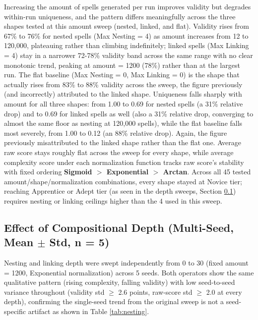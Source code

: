 \documentclass[]{article}
\begin{document}
        Increasing the amount of spells generated per run improves validity but degrades within-run uniqueness, and the pattern differs meaningfully across the three shapes tested at this amount sweep (nested, linked, and flat). Validity rises from 67\% to 76\% for nested spells (Max Nesting = 4) as amount increases from 12 to 120,000, plateauing rather than climbing indefinitely; linked spells (Max Linking = 4) stay in a narrower 72-78\% validity band across the same range with no clear monotonic trend, peaking at amount = 1200 (78\%) rather than at the largest run. The flat baseline (Max Nesting = 0, Max Linking = 0) is the shape that actually rises from 83\% to 88\% validity across the sweep, the figure previously (and incorrectly) attributed to the linked shape. Uniqueness falls sharply with amount for all three shapes: from 1.00 to 0.69 for nested spells (a 31\% relative drop) and to 0.69 for linked spells as well (also a 31\% relative drop, converging to almost the same floor as nesting at 120,000 spells), while the flat baseline falls most severely, from 1.00 to 0.12 (an 88\% relative drop). Again, the figure previously misattributed to the linked shape rather than the flat one. Average raw score stays roughly flat across the sweep for every shape, while average complexity score under each normalization function tracks raw score's stability with fixed ordering \textbf{Sigmoid $>$ Exponential $>$ Arctan}. Across all 45 tested amount/shape/normalization combinations, every shape stayed at Novice tier; reaching Apprentice or Adept tier (as seen in the depth sweeps, Section \ref{results-depth}) requires nesting or linking ceilings higher than the 4 used in this sweep.

        \subsection{Effect of Compositional Depth (Multi-Seed, Mean $\pm$ Std, n = 5)}\label{results-depth}

        Nesting and linking depth were swept independently from 0 to 30 (fixed amount = 1200, Exponential normalization) across 5 seeds. Both operators show the same qualitative pattern (rising complexity, falling validity) with low seed-to-seed variance throughout (validity std $\geq$ 2.6 points, raw-score std $\geq$ 2.0 at every depth), confirming the single-seed trend from the original sweep is not a seed-specific artifact as shown in Table \ref{tab:nesting}.
\end{document}
